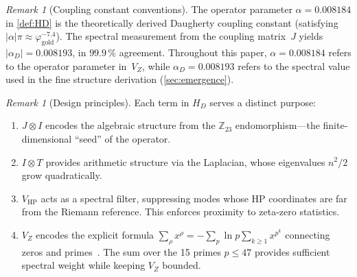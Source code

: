 \documentclass[11pt,a4paper]{article}
\theoremstyle{plain}
\theoremstyle{remark}
\newtheorem{remark}[theorem]{Remark}
\newcommand{\Z}{\mathbb{Z}}
\begin{document}
\begin{remark}[Coupling constant conventions]\label{rem:alpha-values}
The operator parameter $\alpha=0.008184$ in \cref{def:HD} is the
theoretically derived Daugherty coupling constant (satisfying
$|\alpha|\pi\approx\varphi_{\mathrm{gold}}^{-7.4}$).  The spectral
measurement from the coupling matrix~$J$ yields
$|\alpha_D|=0.008193$, in $99.9\,\%$ agreement.  Throughout this paper,
$\alpha=0.008184$ refers to the operator parameter in~$V_Z$, while
$\alpha_D=0.008193$ refers to the spectral value used in the fine
structure derivation (\cref{sec:emergence}).
\end{remark}

\begin{remark}[Design principles]\label{rem:motivation}
Each term in $H_D$ serves a distinct purpose:
\begin{enumerate}[nosep,label=(\roman*)]
  \item $J\otimes I$ encodes the algebraic structure from the $\Z_{23}$
        endomorphism---the finite-dimensional ``seed'' of the operator.
  \item $I\otimes T$ provides arithmetic structure via the Laplacian,
        whose eigenvalues $n^2/2$ grow quadratically.
  \item $V_{\mathrm{HP}}$ acts as a spectral filter, suppressing modes
        whose HP coordinates are far from the Riemann reference.
        This enforces proximity to zeta-zero statistics.
  \item $V_Z$ encodes the explicit formula
        $\sum_\rho x^\rho = -\sum_p \ln p\sum_{k\geq 1}x^{p^k}$
        connecting zeros and primes~\cite{edwards1974}.
        The sum over the 15 primes $p\leq 47$ provides sufficient spectral
        weight while keeping $V_Z$ bounded.
\end{enumerate}
\end{remark}
\end{document}
